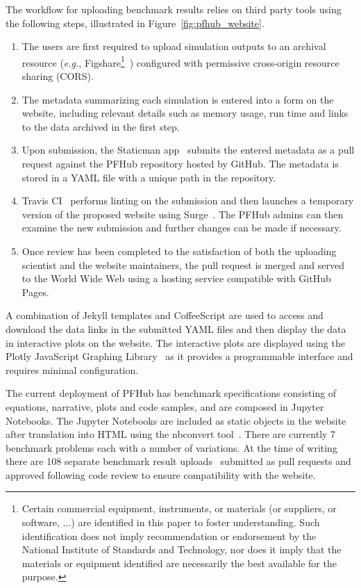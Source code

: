 \documentclass{jors}
\begin{document}
The workflow for uploading benchmark results relies on third party
tools using the following steps, illustrated in
Figure~\ref{fig:pfhub_website}.
\begin{enumerate}
  \item The users are first required to upload simulation outputs to
    an archival resource (\emph{e.g.}, Figshare\footnote{Certain
      commercial equipment, instruments, or materials (or suppliers,
      or software, ...) are identified in this paper to foster
      understanding. Such identification does not imply recommendation
      or endorsement by the National Institute of Standards and
      Technology, nor does it imply that the materials or equipment
      identified are necessarily the best available for the
      purpose.\label{disclaimer}}~\cite{figshare}) configured with
    permissive cross-origin resource sharing (CORS).
  \item The metadata summarizing each simulation is entered into a
    form on the website, including relevant details such as memory
    usage, run time and links to the data archived in the first step.
  \item Upon submission, the Staticman app~\cite{staticman} submits
    the entered metadata as a pull request against the PFHub
    repository hosted by GitHub. The metadata is stored in a YAML file
    with a unique path in the repository.
  \item Travis CI~\cite{travis} performs linting on the submission and
    then launches a temporary version of the proposed website using
    Surge~\cite{surge}. The PFHub admins can then examine the new
    submission and further changes can be made if necessary.
  \item Once review has been completed to the satisfaction of both the
    uploading scientist and the website maintainers, the pull request
    is merged and served to the World Wide Web using a hosting service
    compatible with GitHub Pages.
\end{enumerate}
A combination of Jekyll templates and CoffeeScript are used to access
and download the data links in the submitted YAML files and then
display the data in interactive plots on the website. The interactive
plots are displayed using the Plotly JavaScript Graphing
Library~\cite{plotly} as it provides a programmable interface and
requires minimal configuration.

The current deployment of PFHub has benchmark specifications
consisting of equations, narrative, plots and code samples, and are
composed in Jupyter Notebooks. The Jupyter Notebooks are included as
static objects in the website after translation into HTML using the
nbconvert tool~\cite{jupyter}. There are currently 7 benchmark
problems each with a number of variations. At the time of writing
there are 108 separate benchmark result uploads~\cite{pfhub} submitted
as pull requests and approved following code review to ensure
compatibility with the website.
\end{document}
